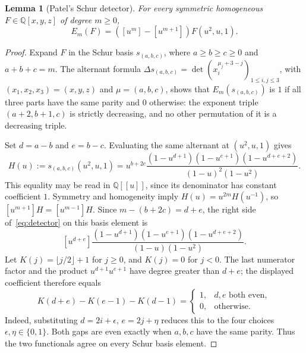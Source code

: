 \documentclass[11pt]{article}
\newtheorem{lemma}[theorem]{Lemma}
\begin{document}
\begin{lemma}[Patel's Schur detector]\label{lem:detector}
For every symmetric homogeneous $F\in\mathbb Q[x,y,z]$ of degree $m\geq0$,
\begin{equation}\label{eq:detector}
 E_m(F)=([u^m]-[u^{m+1}])F(u^2,u,1).
\end{equation}
\end{lemma}
\begin{proof}
Expand $F$ in the Schur basis $s_{(a,b,c)}$, where
$a\geq b\geq c\geq0$ and $a+b+c=m$.
The alternant formula
$\Delta s_{(a,b,c)}=\det(x_i^{\mu_j+3-j})_{1\leq i,j\leq3}$,
with $(x_1,x_2,x_3)=(x,y,z)$ and $\mu=(a,b,c)$,
shows that $E_m(s_{(a,b,c)})$ is $1$ if all three parts have the same parity and $0$
otherwise: the exponent triple $(a+2,b+1,c)$ is strictly decreasing,
and no other permutation of it is a decreasing triple.

Set $d=a-b$ and $e=b-c$.
Evaluating the same alternant at $(u^2,u,1)$ gives
\[
 H(u):=s_{(a,b,c)}(u^2,u,1)
 =u^{b+2c}
 \frac{(1-u^{d+1})(1-u^{e+1})(1-u^{d+e+2})}
 {(1-u)^2(1-u^2)}.
\]
This equality may be read in $\mathbb Q[[u]]$, since its denominator
has constant coefficient $1$.
Symmetry and homogeneity imply $H(u)=u^{2m}H(u^{-1})$, so
$[u^{m+1}]H=[u^{m-1}]H$.
Since $m-(b+2c)=d+e$, the right side of~\eqref{eq:detector} on this basis element is
\[
 [u^{d+e}]\frac{(1-u^{d+1})(1-u^{e+1})(1-u^{d+e+2})}
 {(1-u)(1-u^2)}.
\]
Let $K(j)=\lfloor j/2\rfloor+1$ for $j\geq0$, and $K(j)=0$ for $j<0$.
The last numerator factor and the product $u^{d+1}u^{e+1}$ have degree
greater than $d+e$; the displayed coefficient therefore equals
\[
 K(d+e)-K(e-1)-K(d-1)
 =\begin{cases}1,&d,e\text{ both even},\\0,&\text{otherwise}.\end{cases}
\]
Indeed, substituting $d=2i+\epsilon$, $e=2j+\eta$ reduces this to the
four choices $\epsilon,\eta\in\{0,1\}$.
Both gaps are even exactly when $a,b,c$ have the same parity.
Thus the two functionals agree on every Schur basis element.
\end{proof}
\end{document}
